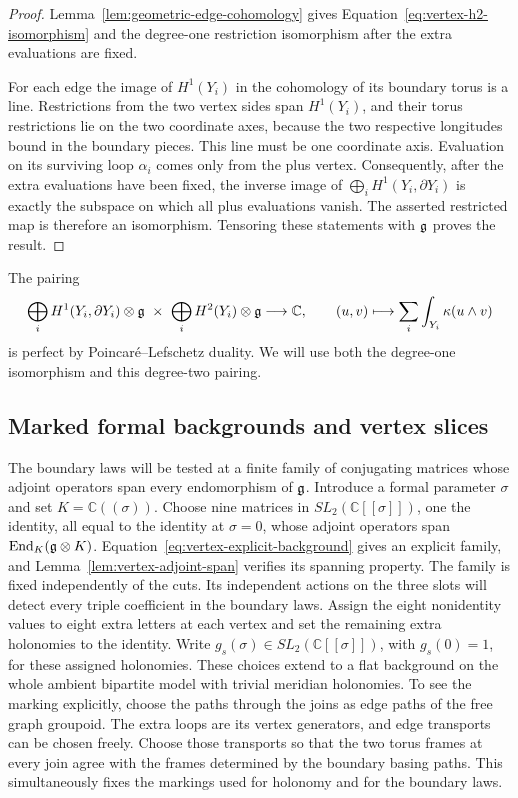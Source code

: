 \begin{proof}
Lemma~\ref{lem:geometric-edge-cohomology} gives
Equation~\eqref{eq:vertex-h2-isomorphism} and the degree-one restriction
isomorphism after the extra evaluations are fixed.

For each edge the image of $H^1(Y_i)$ in the cohomology of its boundary
torus is a line.  Restrictions from the two vertex sides span $H^1(Y_i)$,
and their torus restrictions lie on the two coordinate axes, because the
two respective longitudes bound in the boundary pieces.  This line must
be one coordinate axis.  Evaluation on its surviving loop $\alpha_i$
comes only from the plus vertex.  Consequently, after the extra
evaluations have been fixed, the inverse image of
$\bigoplus_i H^1(Y_i,\partial Y_i)$ is exactly the subspace on which all
plus evaluations vanish.  The asserted restricted map is therefore an
isomorphism.  Tensoring these statements with $\mathfrak{g}$ proves the result.
\end{proof}

The pairing
\begin{equation}
\label{eq:vertex-perfect-edge-pairing}
 \bigoplus_i H^1(Y_i,\partial Y_i)\otimes\mathfrak{g}
 \ \times\ \bigoplus_i H^2(Y_i)\otimes\mathfrak{g}
 \longrightarrow\mathbb C,
 \qquad (u,v)\longmapsto\sum_i\int_{Y_i}\kappa(u\wedge v)
\end{equation}
is perfect by Poincar\'e--Lefschetz duality.  We will use both the
degree-one isomorphism and this degree-two pairing.

\subsection{Marked formal backgrounds and vertex slices}

The boundary laws will be tested at a finite family of conjugating
matrices whose adjoint operators span every endomorphism of $\mathfrak{g}$.
Introduce a formal parameter $\sigma$ and set $K=\mathbb C((\sigma))$.
Choose nine matrices in $SL_2(\mathbb C[[\sigma]])$, one the identity,
all equal to the identity at $\sigma=0$, whose adjoint operators span
$\operatorname{End}_K(\mathfrak{g}\otimes K)$. Equation~\eqref{eq:vertex-explicit-background}
gives an explicit family, and Lemma~\ref{lem:vertex-adjoint-span} verifies
its spanning property. The family is fixed independently of the cuts.
Its independent actions on the three slots will detect every triple
coefficient in the boundary laws. Assign the
eight nonidentity values to eight extra letters at each vertex and set
the remaining extra holonomies to the identity.  Write
$g_s(\sigma)\in SL_2(\mathbb C[[\sigma]])$, with $g_s(0)=1$, for these
assigned holonomies.  These choices extend to a flat background
on the whole ambient bipartite model with trivial meridian holonomies.
To see the marking explicitly, choose the paths through the joins as
edge paths of the free graph groupoid.  The extra loops are its vertex
generators, and edge transports can be chosen freely.  Choose those
transports so that the two torus frames at every join agree with the
frames determined by the boundary basing paths.  This simultaneously
fixes the markings used for holonomy and for the boundary laws.

